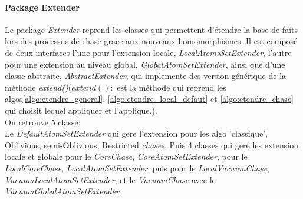     \paragraph{Package Extender} 
    Le package \textit{Extender} reprend les classes qui permettent d'étendre la base de faits lors des processus de chase grace aux nouveaux homomorphismes. Il est composé de deux interfaces l'une pour l'extension locale, \textit{LocalAtomsSetExtender}, l'autre pour une extension au niveau global, \textit{GlobalAtomSetExtender}, ainsi que d'une classe abstraite, \textit{AbstractExtender}, qui implemente des version générique de la méthode \textit{extend()}($extend():$ est la méthode qui reprend les algos\ref{algo:etendre_general}, \ref{algo:etendre_local_defaut} et \ref{algo:etendre_chase} qui choisit lequel appliquer et l'applique.).\\
    On retrouve 5 classe:\\
    Le \textit{DefaultAtomSetExtender} qui gere l'extension pour les algo 'classique', Oblivious, semi-Oblivious, Restricted \textit{chases}.
    Puis 4 classes qui gere les extension locale et globale pour le \textit{CoreChase}, \textit{CoreAtomSetExtender}, pour le \textit{LocalCoreChase}, \textit{LocalAtomSetExtender}, puis pour le \textit{LocalVacuumChase}, \textit{VacuumLocalAtomSetExtender}, et le \textit{VacuumChase} avec le \textit{VacuumGlobalAtomSetExtender}. 
        
